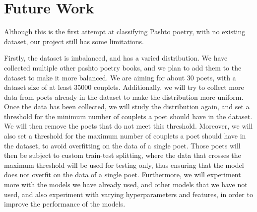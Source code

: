 \section{Future Work}
Although this is the first attempt at classifying Pashto poetry, with no existing dataset, our project still has some limitations. 

Firstly, the dataset is imbalanced, and has a varied distribution. We have collected multiple other pashto poetry books, and we plan to add them to the dataset to make it more balanced. We are aiming for about 30 poets, with a dataset size of at least 35000 couplets. Additionally, we will try to collect more data from poets already in the dataset to make the distribution more uniform. Once the data has been collected, we will study the distribution again, and set a threshold for the minimum number of couplets a poet should have in the dataset. We will then remove the poets that do not meet this threshold. Moreover, we will also set a threshold for the maximum number of couplets a poet should have in the dataset, to avoid overfitting on the data of a single poet. Those poets will then be subject to custom train-test splitting, where the data that crosses the maximum threshold will be used for testing only, thus ensuring that the model does not overfit on the data of a single poet. Furthermore, we will experiment more with the models we have already used, and other models that we have not used, and also experiment with varying hyperparameters and features, in order to improve the performance of the models. 